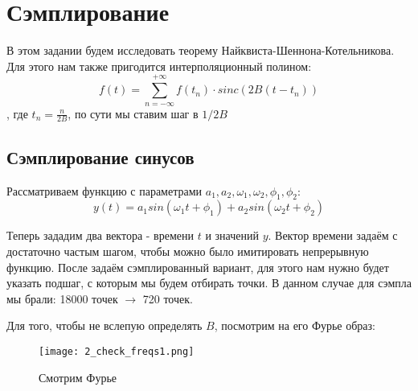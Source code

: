 \chapter{Сэмплирование}
\label{ch:chap2}


\lstset{style=mystyle}

В этом задании будем исследовать теорему Найквиста-Шеннона-Котельникова. Для этого нам также пригодится интерполяционный полином:
$$f(t) = \sum_{n=-\infty}^{+\infty}f(t_n)\cdot sinc(2B(t-t_n))$$ , где $t_n = \frac{n}{2B}$, по сути мы ставим шаг в $1/2B$


\section{Сэмплирование синусов}

Рассматриваем функцию с параметрами $a_1, a_2, \omega_1, \omega_2, \phi_1, \phi_2$:
$$y(t) = a_1 sin(\omega_1 t + \phi_1) + a_2 sin(\omega_2 t+\phi_2)$$

Теперь зададим два вектора - времени $t$ и значений $y$. Вектор времени задаём с достаточно частым шагом, чтобы можно было имитировать непрерывную функцию.
После задаём сэмплированный вариант, для этого нам нужно будет указать подшаг, с которым мы будем отбирать точки. В данном случае для сэмпла мы брали: 18000 точек $\rightarrow$ 720 точек.

Для того, чтобы не вслепую определять $B$, посмотрим на его Фурье образ:

\begin{figure}[ht]
    \centering
    \texttt{[image: 2\_check\_freqs1.png]}
	\caption{Смотрим Фурье}
\end{figure}

